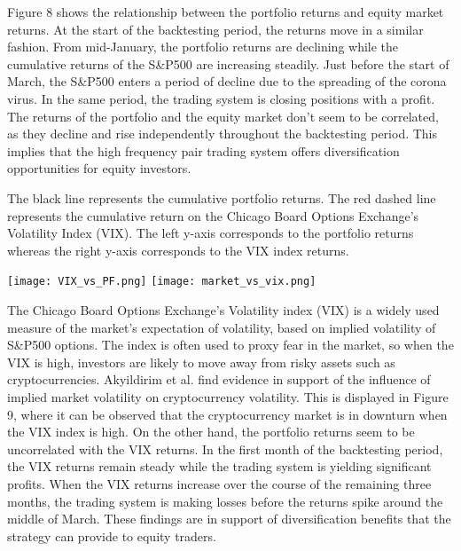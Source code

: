 \documentclass[12pt,english,authoryear]{article}
\begin{document}
Figure 8 shows the relationship between the portfolio returns and equity market returns. At the start of the backtesting period, the returns move in a similar fashion. From mid-January, the portfolio returns are declining while the cumulative returns of the S\&P500 are increasing steadily. Just before the start of March, the S\&P500 enters a period of decline due to the spreading of the corona virus. In the same period, the trading system is closing positions with a profit. The returns of the portfolio and the equity market don't seem to be correlated, as they decline and rise independently throughout the backtesting period. This implies that the high frequency pair trading system offers diversification opportunities for equity investors. 

\begin{center}
\begin{minipage}{\textwidth}
\caption*{\footnotesize The black line represents the cumulative portfolio returns. The red dashed line represents the cumulative return on the Chicago Board Options Exchange's Volatility Index (VIX). The left y-axis corresponds to the portfolio returns whereas the right y-axis corresponds to the VIX index returns.}
\texttt{[image: VIX\_vs\_PF.png]}
\texttt{[image: market\_vs\_vix.png]}
\end{minipage}
\end{center}

The Chicago Board Options Exchange's Volatility index (VIX) is a widely used measure of the market's expectation of volatility, based on implied volatility of S\&P500 options. The index is often used to proxy fear in the market, so when the VIX is high, investors are likely to move away from risky assets such as cryptocurrencies. Akyildirim et al. \citeyear{Akyildirim_2020} find evidence in support of the influence of implied market volatility on cryptocurrency volatility. This is displayed in Figure 9, where it can be observed that the cryptocurrency market is in downturn when the VIX index is high. On the other hand, the portfolio returns seem to be uncorrelated with the VIX returns. In the first month of the backtesting period, the VIX returns remain steady while the trading system is yielding significant profits. When the VIX returns increase over the course of the remaining three months, the trading system is making losses before the returns spike around the middle of March. These findings are in support of diversification benefits that the strategy can provide to equity traders. 
\end{document}
